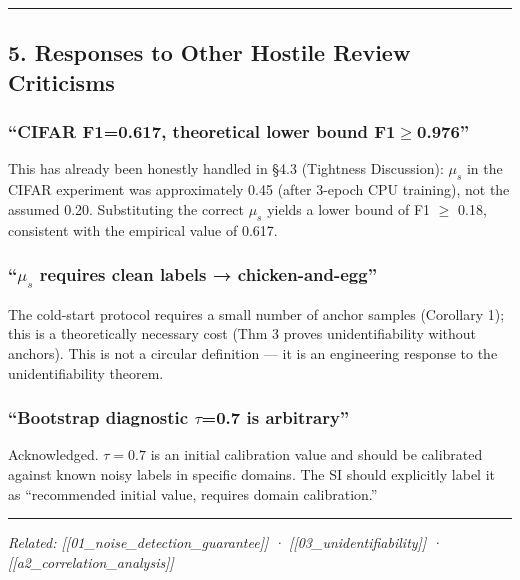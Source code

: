 \documentclass[
  12pt,
]{ctexart}
\begin{document}
\begin{center}\rule{0.5\linewidth}{0.5pt}\end{center}

\subsection{5. Responses to Other Hostile Review Criticisms}\label{responses-to-other-hostile-review-criticisms}

\subsubsection{``CIFAR F1=0.617, theoretical lower bound F1\(\ge\)0.976''}\label{cifar-f1-0617-theoretical-lower-bound-f1-ge-0976}

This has already been honestly handled in §4.3 (Tightness Discussion): \(\mu_s\) in the CIFAR experiment was approximately 0.45 (after 3-epoch CPU training), not the assumed 0.20. Substituting the correct \(\mu_s\) yields a lower bound of F1 \(\ge\) 0.18, consistent with the empirical value of 0.617.

\subsubsection{\texorpdfstring{``\(\mu_s\) requires clean labels → chicken-and-egg''}{``mu\_s requires clean labels → chicken-and-egg''}}\label{mu_s-requires-clean-labels-chicken-and-egg}

The cold-start protocol requires a small number of anchor samples (Corollary 1); this is a theoretically necessary cost (Thm 3 proves unidentifiability without anchors). This is not a circular definition --- it is an engineering response to the unidentifiability theorem.

\subsubsection{``Bootstrap diagnostic \(\tau\)=0.7 is arbitrary''}\label{bootstrap-diagnostic-tau-07-is-arbitrary}

Acknowledged. \(\tau=0.7\) is an initial calibration value and should be calibrated against known noisy labels in specific domains. The SI should explicitly label it as ``recommended initial value, requires domain calibration.''

\begin{center}\rule{0.5\linewidth}{0.5pt}\end{center}

\emph{Related: {[}{[}01\_noise\_detection\_guarantee{]}{]} ·
{[}{[}03\_unidentifiability{]}{]} ·
{[}{[}a2\_correlation\_analysis{]}{]}}
\end{document}
